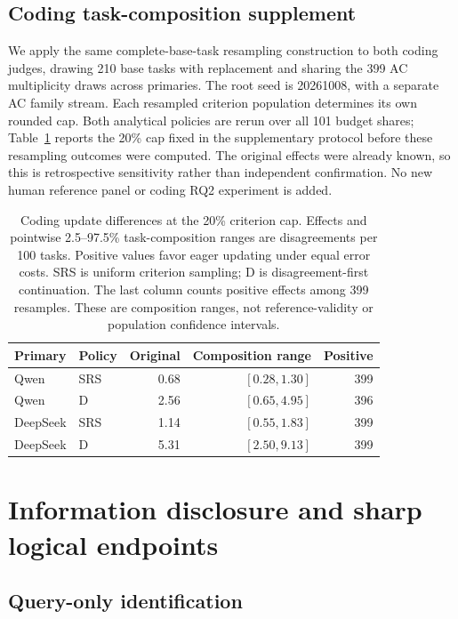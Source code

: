 \subsection{Coding task-composition supplement}\label{app:coding-composition}
We apply the same complete-base-task resampling construction to both coding judges, drawing 210 base tasks with replacement and sharing the 399 AC multiplicity draws across primaries. The root seed is 20261008, with a separate AC family stream. Each resampled criterion population determines its own rounded cap. Both analytical policies are rerun over all 101 budget shares; Table~\ref{tab:coding-composition} reports the 20\% cap fixed in the supplementary protocol before these resampling outcomes were computed. The original effects were already known, so this is retrospective sensitivity rather than independent confirmation. No new human reference panel or coding RQ2 experiment is added.

\begin{table}[htbp]
\centering\small
\caption{Coding update differences at the 20\% criterion cap. Effects and pointwise 2.5--97.5\% task-composition ranges are disagreements per 100 tasks. Positive values favor eager updating under equal error costs. SRS is uniform criterion sampling; D is disagreement-first continuation. The last column counts positive effects among 399 resamples. These are composition ranges, not reference-validity or population confidence intervals.}
\label{tab:coding-composition}
\begin{tabular}{llrrr}
\toprule
Primary & Policy & Original & Composition range & Positive\\
\midrule
Qwen & SRS & 0.68 & $[0.28,1.30]$ & 399\\
Qwen & D & 2.56 & $[0.65,4.95]$ & 396\\
DeepSeek & SRS & 1.14 & $[0.55,1.83]$ & 399\\
DeepSeek & D & 5.31 & $[2.50,9.13]$ & 399\\
\bottomrule
\end{tabular}
\end{table}

\section{Information disclosure and sharp logical endpoints}
\label{app:disclosure}

\subsection{Query-only identification}

